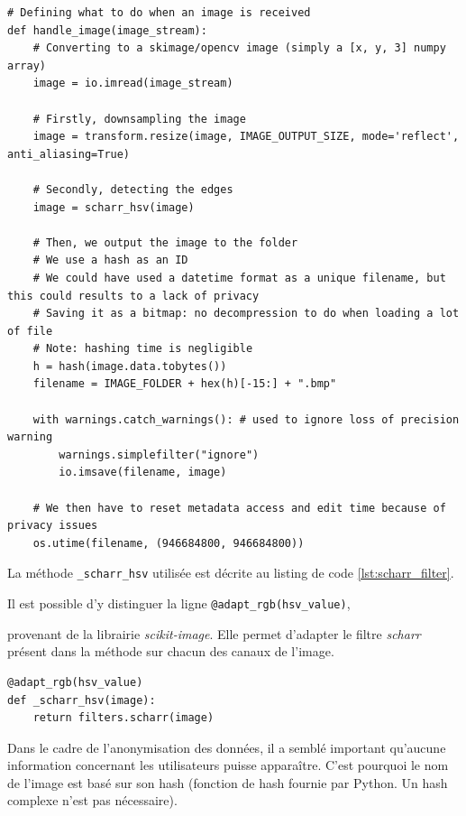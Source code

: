 \begin{lstlisting}[caption={Traitement des images reçues}, label={lst:handling_image}] 
# Defining what to do when an image is received
def handle_image(image_stream):
    # Converting to a skimage/opencv image (simply a [x, y, 3] numpy array)
    image = io.imread(image_stream)

    # Firstly, downsampling the image
    image = transform.resize(image, IMAGE_OUTPUT_SIZE, mode='reflect', anti_aliasing=True)

    # Secondly, detecting the edges
    image = scharr_hsv(image)

    # Then, we output the image to the folder
    # We use a hash as an ID
    # We could have used a datetime format as a unique filename, but this could results to a lack of privacy
    # Saving it as a bitmap: no decompression to do when loading a lot of file
    # Note: hashing time is negligible
    h = hash(image.data.tobytes())
    filename = IMAGE_FOLDER + hex(h)[-15:] + ".bmp"

    with warnings.catch_warnings(): # used to ignore loss of precision warning
        warnings.simplefilter("ignore")
        io.imsave(filename, image)

    # We then have to reset metadata access and edit time because of privacy issues
    os.utime(filename, (946684800, 946684800))
\end{lstlisting}

La méthode \lstinline[columns=fixed]{_scharr_hsv} utilisée est décrite au listing de code \ref{lst:scharr_filter}. 

Il est possible d'y distinguer la ligne \lstinline[columns=fixed]{@adapt_rgb(hsv_value)}, 

provenant de la librairie \textit{scikit-image}. Elle permet d'adapter le filtre \textit{scharr} présent dans la méthode sur chacun des canaux de l'image.

\begin{lstlisting}[caption={Détection de bord à l'aide de \textit{scikit-image}}, label={lst:scharr_filter}] 
@adapt_rgb(hsv_value)
def _scharr_hsv(image):
    return filters.scharr(image)
\end{lstlisting}

Dans le cadre de l'anonymisation des données, il a semblé important qu'aucune information concernant les utilisateurs puisse apparaître. C'est pourquoi le nom de l'image est basé sur son hash (fonction de hash fournie par Python. Un hash complexe n'est pas nécessaire). 


